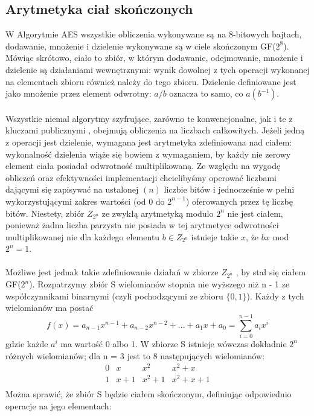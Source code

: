 \documentclass[12pt, letterpaper, titlepage]{article}
\begin{document}
\subsection{Arytmetyka ciał skończonych}
W Algorytmie AES wszystkie obliczenia wykonywane są na 8-bitowych bajtach, dodawanie,
mnożenie i dzielenie wykonywane są w ciele skończonym GF($2^8$). Mówiąc skrótowo, ciało to
zbiór, w którym dodawanie, odejmowanie, mnożenie i dzielenie są działaniami wewnętrznymi:
wynik dowolnej z tych operacji wykonanej na elementach zbioru również należy do tego zbioru.
Dzielenie definiowane jest jako mnożenie przez element odwrotny: $a/b$ oznacza to samo,
co $a(b^{-1})$. \\
\\
Wszystkie niemal algorytmy szyfrujące, zarówno te konwencjonalne, jak i te z kluczami publicznymi
, obejmują obliczenia na liczbach całkowitych. Jeżeli jedną z operacji jest dzielenie,
wymagana jest arytmetyka zdefiniowana nad ciałem: wykonalność dzielenia wiąże się bowiem
z wymaganiem, by każdy nie zerowy element ciała posiadał odwrotność multiplikowaną. Ze
względu na wygodę obliczeń oraz efektywności implementacji chcielibyśmy operować liczbami
dającymi się zapisywać na ustalonej $(n)$ liczbie bitów i jednocześnie w pełni wykorzystującymi
zakres wartości (od $0$ do $2^{n-1}$) oferowanych przez tę liczbę bitów. Niestety, zbiór $Z_{2^n}$ ze
zwykłą arytmetyką modulo $2^n$ nie jest ciałem, ponieważ żadna liczba parzysta nie posiada w
tej arytmetyce odwrotności multiplikowanej nie dla każdego elementu $b \in Z_{2^n}$ istnieje takie
$x$, że $bx$ mod $2^n = 1$. \\
\\
Możliwe jest jednak takie zdefiniowanie działań w zbiorze $Z_{2^n}$ , by stał się ciałem GF($2^n$).
Rozpatrzymy zbiór S wielomianów stopnia nie wyższego niż n - 1 ze współczynnikami binarnymi
(czyli pochodzącymi ze zbioru $\{0,1\}$). Każdy z tych wielomianów ma postać
$$f(x) = a_{n-1}x^{n-1} + a_{n-2}x^{n-2} + \ldots + a_1x + a_0 = \sum_{i=0}^{n-1}a_ix^i$$
gdzie każde $a^i$ ma wartość 0 albo 1. W zbiorze S istnieje wówczas dokładnie $2^n$ różnych
wielomianów; dla n = 3 jest to 8 następujących wielomianów:
$$\begin{array}{llll}
0&x&x^2&x^2 + x \\
1&x + 1&x^2 + 1&x^2 + x + 1 \\
\end{array}$$
\newpage
\noindent Można sprawić, że zbiór S będzie ciałem skończonym, definiując odpowiednio operacje na
jego elementach:
\end{document}
